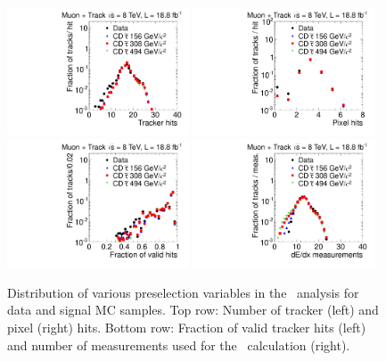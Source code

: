 \begin{figure}
\centering
  \includegraphics[clip=false, trim=0.0cm 0cm 0.0cm 0cm, width=0.48\textwidth]{figures/tkmu/Selection_Comp_8TeV_GMStau_NOH_BS}
  \includegraphics[clip=false, trim=0.0cm 0cm 0.0cm 0cm, width=0.48\textwidth]{figures/tkmu/Selection_Comp_8TeV_GMStau_NOPH_BS} \\
  \includegraphics[clip=false, trim=0.0cm 0cm 0.0cm 0cm, width=0.48\textwidth]{figures/tkmu/Selection_Comp_8TeV_GMStau_NOHFraction_BS}
  \includegraphics[clip=false, trim=0.0cm 0cm 0.0cm 0cm, width=0.48\textwidth]{figures/tkmu/Selection_Comp_8TeV_GMStau_NOM_BS}
  \caption[Distribution of number of tracker and pixel hits, fraction of valid tracker hits, and number of \dedx\ measurements in the \tktof\ analysis for data and signal MC samples.]
{Distribution of various preselection variables in the \tktof\ analysis for data and signal MC samples.
Top row: Number of tracker (left) and pixel (right) hits.
Bottom row: Fraction of valid tracker hits (left) and number of measurements used for the \dedx\ calculation (right).}
    \label{fig:TkMuPreselA}
\end{figure}

